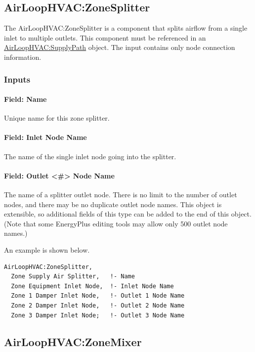 \subsection{AirLoopHVAC:ZoneSplitter}\label{airloophvaczonesplitter}

The AirLoopHVAC:ZoneSplitter is a component that splits airflow from a single inlet to multiple outlets. This component must be referenced in an \hyperref[airloophvacsupplypath]{AirLoopHVAC:SupplyPath} object. The input contains only node connection information.

\subsubsection{Inputs}

\paragraph{Field: Name}

Unique name for this zone splitter.

\paragraph{Field: Inlet Node Name}

The name of the single inlet node going into the splitter.

\paragraph{Field: Outlet \textless{}\#\textgreater{} Node Name}

The name of a splitter outlet node. There is no limit to the number of outlet nodes, and there may be no duplicate outlet node names.  This object is extensible, so additional fields of this type can be added to the end of this object.  (Note that some EnergyPlus editing tools may allow only 500 outlet node names.)

An example is shown below.

\begin{lstlisting}
AirLoopHVAC:ZoneSplitter,
  Zone Supply Air Splitter,   !- Name
  Zone Equipment Inlet Node,  !- Inlet Node Name
  Zone 1 Damper Inlet Node,   !- Outlet 1 Node Name
  Zone 2 Damper Inlet Node,   !- Outlet 2 Node Name
  Zone 3 Damper Inlet Node;   !- Outlet 3 Node Name
\end{lstlisting}

\subsection{AirLoopHVAC:ZoneMixer}\label{airloophvaczonemixer}

